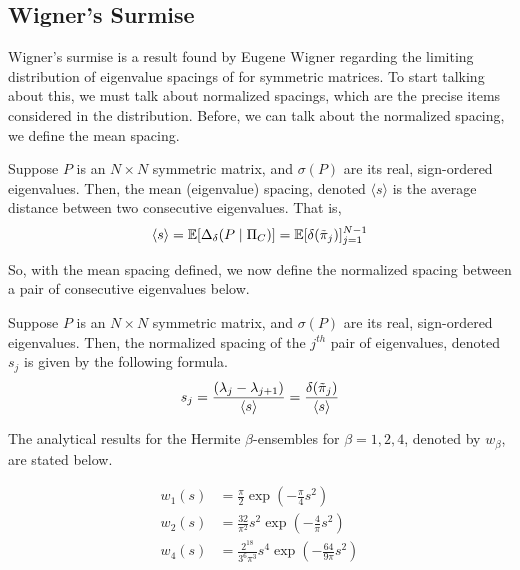 
\subsection{Wigner's Surmise}

Wigner's surmise is a result found by Eugene Wigner regarding the limiting distribution of eigenvalue spacings of for symmetric matrices. To start talking about this, we must talk about normalized spacings, which are the precise items considered in the distribution. Before, we can talk about the normalized spacing, we define the mean spacing.

\begin{definition}
Suppose $P$ is an $N \times N$ symmetric matrix, and $\sigma(P)$ are its real, sign-ordered eigenvalues. Then, the mean (eigenvalue) spacing, denoted $\langle s \rangle$ is the average distance between two consecutive eigenvalues. That is,
$$\langle s \rangle = \mathbb{E}[\Delta_\delta(P \mid \Pi_C)] = \mathbb{E}[\delta({\tilde{\pi}}_{j})]_{j = 1}^{N - 1}$$
\end{definition}

\noindent So, with the mean spacing defined, we now define the normalized spacing between a pair of consecutive eigenvalues below.

\begin{definition}
Suppose $P$ is an $N \times N$ symmetric matrix, and $\sigma(P)$ are its real, sign-ordered eigenvalues. Then, the normalized spacing of the $j^{th}$ pair of eigenvalues, denoted $s_j$ is given by the following formula.
$$s_j = \frac{(\lambda_j - \lambda_{j+1})}{\langle s \rangle} = \frac{\delta({\tilde{\pi}}_{j})}{\langle s \rangle}$$
\end{definition}


\newpage


The analytical results for the Hermite $\beta$-ensembles for $\beta = 1, 2, 4$, denoted by $w_\beta$, are stated below.

\begin{align*}
  w_1(s) &= \frac{\pi}{2} \exp(-\frac{\pi}{4}s^2) \\
  w_2(s) &= \frac{32}{\pi^2} s^2 \exp(-\frac{4}{\pi}s^2) \\
  w_4(s) &= \frac{2^{18}}{3^{6}\pi^3} s^4 \exp(-\frac{64}{9\pi}s^2) \\
\end{align*}

